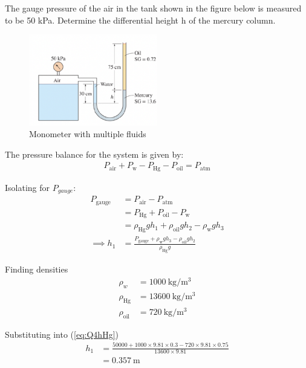 \section{}
The gauge pressure of the air in the tank shown in the figure below is
measured to be 50 kPa. Determine the differential height h of the mercury column.

\begin{figure}[h]
    \centering
    \includegraphics[width=0.5\textwidth]{Questions/Figures/Q4ProblemDiagram.png}
    \caption{Monometer with multiple fluids}
    \label{fig:Q4 System}
\end{figure}

The pressure balance for the system is given by:
\begin{align}
    P_{\text{air}} + P_{\text{w}} - P_{\text{Hg}} - P_{\text{oil}} = P_{\text{atm}} \nonumber
\end{align}

Isolating for $P_{gauge}$:
\begin{align}
    P_{\text{gauge}} &= P_{\text{air}} - P_{\text{atm}} \nonumber \\
    &= P_{\text{Hg}} + P_{\text{oil}} - P_{\text{w}} \nonumber \\
    &= \rho_{\text{Hg}} g h_1 + \rho_{\text{oil}} g h_{2} - \rho_{\text{w}} g h_3 \nonumber \\
    \implies h_1 &= \frac{P_{\text{gauge}} + \rho_{\text{w}} g h_3 - \rho_{\text{oil}} g h_2}{\rho_{\text{Hg}} g} \label{eq:Q4hHg}
\end{align}

Finding densities
\begin{align*}
    \rho_w &= \qty{1000}{\kilogram\per\meter\cubed} \\
    \rho_{\text{Hg}} &= \qty{13600}{\kilogram\per\meter\cubed} \\
    \rho_{\text{oil}} &= \qty{720}{\kilogram\per\meter\cubed} 
\end{align*}

Substituting into (\ref{eq:Q4hHg})
\begin{align}
    h_1 &= \frac{50000 + 1000 \times 9.81 \times 0.3 - 720 \times 9.81 \times 0.75}{13600 \times 9.81} \nonumber \\
    &= \boxed{\qty{0.357}{\meter}} \nonumber
\end{align}